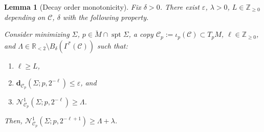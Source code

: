 \documentclass[11pt, letterpaper, reqno]{amsart}
\numberwithin{equation}{section}
\newtheorem{Lem}[Def]{Lemma}
\theoremstyle{remark}
\newcommand{\RR}{\mathbb{R}}
\newcommand{\ZZ}{\mathbb{Z}}
\newcommand{\cC}{\mathcal{C}}
\newcommand{\cN}{\mathcal{N}}
\newcommand{\mbfd}{\mathbf{d}}
\newcommand{\spt}{\operatorname{spt}}
\newcommand{\eps}{\varepsilon}
\begin{document}
\begin{Lem}[Decay order monotonicity]\label{Lem_Refined_Freq Almst Monon}
Fix $\delta > 0$. There exist $\eps$, $\lambda > 0$, $L \in \ZZ_{\geq 0}$ depending on $\cC$, $\delta$ with the following property.

Consider minimizing $\Sigma$, $p \in \breve M \cap \spt \Sigma$, a copy $\cC_p := \iota_p(\cC) \subset T_p M$, $\ell \in \ZZ_{\geq 0}$, and $\Lambda \in \RR_{< 2} \setminus B_\delta(\Gamma^*(\cC))$ such that:
\begin{enumerate}
\item $\ell \geq L$,
\item $\mbfd_{\cC_p}(\Sigma;p,2^{-\ell}) \leq \eps$, and
\item $\cN^{1}_{\cC_p}(\Sigma;p,2^{-\ell}) \geq \Lambda$.
\end{enumerate} 
Then,  $\cN^{1}_{\cC_p}(\Sigma;p,2^{-\ell+1}) \geq \Lambda + \lambda$.
\end{Lem}
\end{document}
